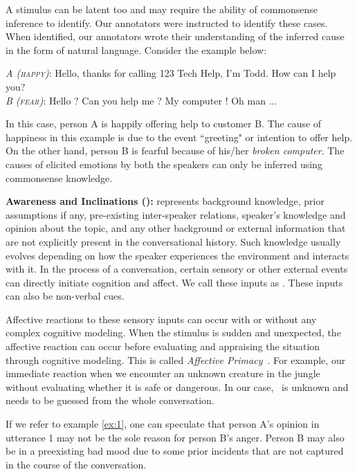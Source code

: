 \documentclass[11pt,a4paper]{article}
\theoremstyle{definition}
\newcommand\emo[1]{\textsc{#1}}
\begin{document}
A stimulus can be latent too and may require the ability of commonsense inference to identify. Our annotators were instructed to identify these cases. When identified, our annotators wrote their understanding of the inferred cause in the form of natural language. Consider the example below:

\begin{exe}
\ex \textit{A (\emo{happy})}: Hello, thanks for calling 123 Tech Help, I'm Todd. How can I help you?\\
\textit{B (\emo{fear})}: Hello ? Can you help me ? My computer ! Oh man ...
\label{ex:latent2}
\end{exe}

In this case, person A is happily offering help to customer B. The cause of happiness in this example is due to the event ``greeting" or intention to offer help. On the other hand, person B is fearful because of his/her \textit{broken computer}. The causes of elicited emotions by both the speakers can only be inferred using commonsense knowledge.

\textbf{Awareness and Inclinations ():}  represents background knowledge, prior assumptions if any, pre-existing inter-speaker relations, speaker's knowledge and opinion about the topic, and any other background or external information that are not explicitly present in the conversational history. Such knowledge usually evolves depending on how the speaker experiences the environment and interacts with it. In the process of a conversation, certain sensory or other external events can directly initiate cognition and affect. We call these inputs as . These inputs can also be non-verbal cues.

Affective reactions to these sensory inputs can occur with or without any complex cognitive modeling. When the stimulus is sudden and unexpected, the affective reaction can occur before evaluating and appraising the situation through cognitive modeling. This is called \emph{Affective Primacy}~\citep{Zajonc80feelingand}. For example, our immediate reaction when we encounter an unknown creature in the jungle without evaluating whether it is safe or dangerous.
In our case,~ is unknown and  needs to be guessed from the whole conversation. 

If we refer to example \ref{ex:1}, one can speculate that person A's opinion in utterance 1 may not be the sole reason for person B's anger. Person B may also be in a preexisting bad mood due to some prior incidents that are not captured in the course of the conversation.
\end{document}

